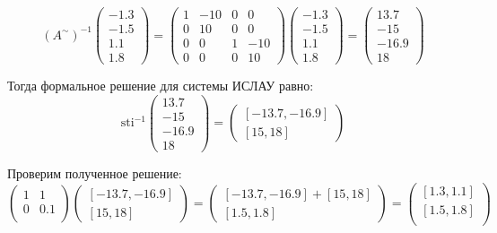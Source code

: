 \documentclass[12pt,a4paper]{scrartcl}
\begin{document}
\begin{equation}
  (A^{\sim})^{-1}
\begin{pmatrix} 
	-1.3 \\
    -1.5 \\
    1.1 \\
    1.8 
\end{pmatrix} = 
  \begin{pmatrix} 
	1 & -10 & 0 & 0 \\
	0 & 10 & 0 & 0 \\
	0 & 0 & 1 & -10 \\
	0 & 0 & 0 & 10
  \end{pmatrix}
\begin{pmatrix} 
	-1.3 \\
    -1.5 \\
    1.1 \\
    1.8 
\end{pmatrix} 
 = 
\begin{pmatrix} 13.7 \\ -15 \\ -16.9 \\ 18 \end{pmatrix}
\end{equation}

Тогда формальное решение для системы ИСЛАУ равно:
\begin{equation}
  \mathrm{sti}^{-1}\begin{pmatrix} 13.7 \\ -15 \\ -16.9 \\ 18 \end{pmatrix} = \begin{pmatrix} [-13.7, -16.9] \\ [15, 18]\end{pmatrix}
\end{equation}

Проверим полученное решение:
\begin{equation}
  \begin{pmatrix}
    1 & 1 \\
    0 & 0.1 \\
    \end{pmatrix}\begin{pmatrix} [-13.7, -16.9] \\ [15, 18]\end{pmatrix} = \begin{pmatrix} [-13.7, -16.9] + [15, 18] \\ [1.5, 1.8]\end{pmatrix} = \begin{pmatrix} [1.3, 1.1] \\
[1.5, 1.8] \\\end{pmatrix}
\end{equation}
\end{document}
